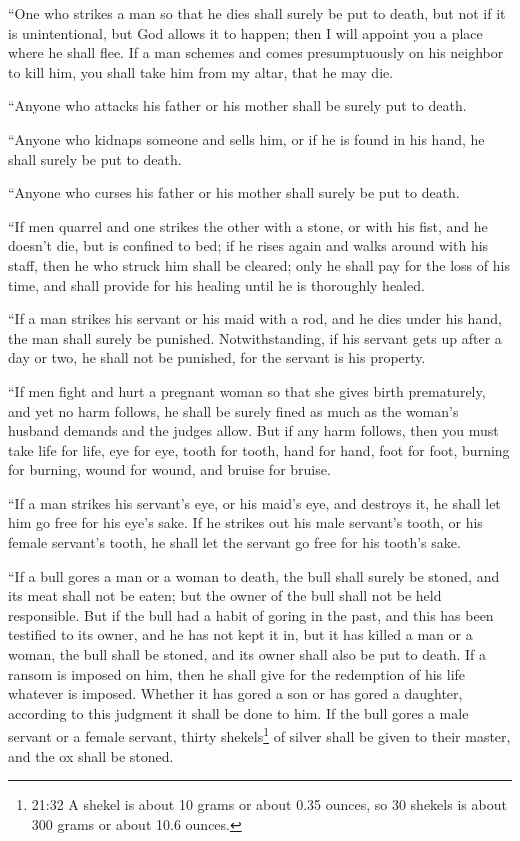 \myverse{}“One who strikes a man so that he dies shall surely be put to
death,
\myverse{}but not if it is unintentional, but God allows it to happen; then I will
appoint you a place where he shall flee.
\myverse{}If a man schemes and comes presumptuously on his neighbor to kill him, you
shall take him from my altar, that he may die.


\myverse{}“Anyone who attacks his father or his mother shall be surely
put to death.


\myverse{}“Anyone who kidnaps someone and sells him, or if he is found
in his hand, he shall surely be put to death.


\myverse{}“Anyone who curses his father or his mother shall surely be
put to death.


\myverse{}“If men quarrel and one strikes the other with a stone, or with
his fist, and he doesn’t die, but is confined to bed;
\myverse{}if he rises again and walks around with his staff, then he who struck him
shall be cleared; only he shall pay for the loss of his time, and shall provide for his healing until
he is thoroughly healed.


\myverse{}“If a man strikes his servant or his maid with a rod, and he
dies under his hand, the man shall surely be punished.
\myverse{}Notwithstanding, if his servant gets up after a day or two, he shall not
be punished, for the servant is his property.


\myverse{}“If men fight and hurt a pregnant woman so that she gives birth
prematurely, and yet no harm follows, he shall be surely fined as much as the woman’s husband demands
and the judges allow.
\myverse{}But if any harm follows, then you must take life for life,
\myverse{}eye for eye, tooth for tooth, hand for hand, foot for foot,
\myverse{}burning for burning, wound for wound, and bruise for bruise.


\myverse{}“If a man strikes his servant’s eye, or his maid’s eye, and
destroys it, he shall let him go free for his eye’s sake.
\myverse{}If he strikes out his male servant’s tooth, or his female servant’s tooth,
he shall let the servant go free for his tooth’s sake.


\myverse{}“If a bull gores a man or a woman to death, the bull shall surely
be stoned, and its meat shall not be eaten; but the owner of the bull shall not be held responsible.
\myverse{}But if the bull had a habit of goring in the past, and this has been testified
to its owner, and he has not kept it in, but it has killed a man or a woman, the bull shall be stoned,
and its owner shall also be put to death.
\myverse{}If a ransom is imposed on him, then he shall give for the redemption of his
life whatever is imposed.
\myverse{}Whether it has gored a son or has gored a daughter, according to this judgment
it shall be done to him.
\myverse{}If the bull gores a male servant or a female servant, thirty shekels\footnote{21:32 A shekel is about 10 grams or about 0.35 ounces, so 30 shekels is about 300 grams or about 10.6
	ounces.} of silver shall be given to their master, and the ox shall be stoned.


